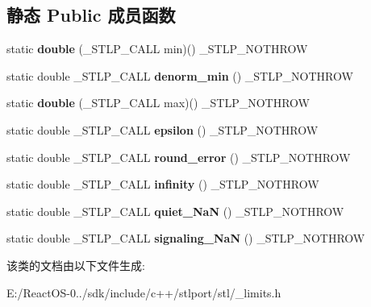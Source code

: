 \subsection*{静态 Public 成员函数}
\begin{DoxyCompactItemize}
\item 
\mbox{\label{classnumeric__limits_3_01double_01_4_a95934611d75b197dd1676724adfd00e2}} 
static {\bfseries double} (\+\_\+\+S\+T\+L\+P\+\_\+\+C\+A\+LL min)() \+\_\+\+S\+T\+L\+P\+\_\+\+N\+O\+T\+H\+R\+OW
\item 
\mbox{\label{classnumeric__limits_3_01double_01_4_ab394f028a59654298b5f1bda34e7249c}} 
static double \+\_\+\+S\+T\+L\+P\+\_\+\+C\+A\+LL {\bfseries denorm\+\_\+min} () \+\_\+\+S\+T\+L\+P\+\_\+\+N\+O\+T\+H\+R\+OW
\item 
\mbox{\label{classnumeric__limits_3_01double_01_4_a15a7bba4e447074f6b9f3bf3303df721}} 
static {\bfseries double} (\+\_\+\+S\+T\+L\+P\+\_\+\+C\+A\+LL max)() \+\_\+\+S\+T\+L\+P\+\_\+\+N\+O\+T\+H\+R\+OW
\item 
\mbox{\label{classnumeric__limits_3_01double_01_4_a86f91fb491c9a8f8efed36d4353cc875}} 
static double \+\_\+\+S\+T\+L\+P\+\_\+\+C\+A\+LL {\bfseries epsilon} () \+\_\+\+S\+T\+L\+P\+\_\+\+N\+O\+T\+H\+R\+OW
\item 
\mbox{\label{classnumeric__limits_3_01double_01_4_a38959110d38c5b424a66dd9358964248}} 
static double \+\_\+\+S\+T\+L\+P\+\_\+\+C\+A\+LL {\bfseries round\+\_\+error} () \+\_\+\+S\+T\+L\+P\+\_\+\+N\+O\+T\+H\+R\+OW
\item 
\mbox{\label{classnumeric__limits_3_01double_01_4_ab7401e6f6c514ce499ae1a13e87bc5af}} 
static double \+\_\+\+S\+T\+L\+P\+\_\+\+C\+A\+LL {\bfseries infinity} () \+\_\+\+S\+T\+L\+P\+\_\+\+N\+O\+T\+H\+R\+OW
\item 
\mbox{\label{classnumeric__limits_3_01double_01_4_aa202f7f4fb079755e6e11ea5029bb419}} 
static double \+\_\+\+S\+T\+L\+P\+\_\+\+C\+A\+LL {\bfseries quiet\+\_\+\+NaN} () \+\_\+\+S\+T\+L\+P\+\_\+\+N\+O\+T\+H\+R\+OW
\item 
\mbox{\label{classnumeric__limits_3_01double_01_4_a2ef248c5be5394ba6b9cd03d178b4279}} 
static double \+\_\+\+S\+T\+L\+P\+\_\+\+C\+A\+LL {\bfseries signaling\+\_\+\+NaN} () \+\_\+\+S\+T\+L\+P\+\_\+\+N\+O\+T\+H\+R\+OW
\end{DoxyCompactItemize}


该类的文档由以下文件生成\+:\begin{DoxyCompactItemize}
\item 
E\+:/\+React\+O\+S-\/0../sdk/include/c++/stlport/stl/\+\_\+limits.\+h\end{DoxyCompactItemize}
